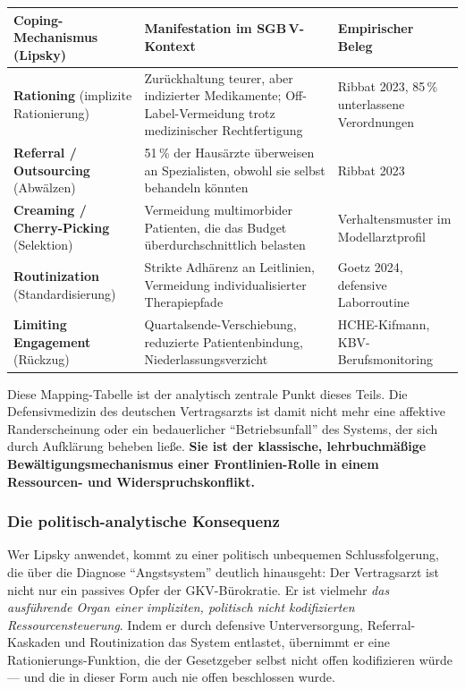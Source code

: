\documentclass{umbruch-position}
\begin{document}
{\small
\begin{tabularx}{\textwidth}{X X X}
\toprule
\textbf{Coping-Mechanismus (Lipsky)} & \textbf{Manifestation im SGB\,V-Kontext} & \textbf{Empirischer Beleg} \\
\midrule
\textbf{Rationing} (implizite Rationierung) & Zurückhaltung teurer, aber indizierter Medikamente; Off-Label-Vermeidung trotz medizinischer Rechtfertigung & Ribbat 2023, 85\,\% unterlassene Verordnungen \\
\textbf{Referral / Outsourcing} (Abwälzen) & 51\,\% der Hausärzte überweisen an Spezialisten, obwohl sie selbst behandeln könnten & Ribbat 2023 \\
\textbf{Creaming / Cherry-Picking} (Selektion) & Vermeidung multimorbider Patienten, die das Budget überdurchschnittlich belasten & Verhaltensmuster im Modellarztprofil \\
\textbf{Routinization} (Standardisierung) & Strikte Adhärenz an Leitlinien, Vermeidung individualisierter Therapiepfade & Goetz 2024, defensive Laborroutine \\
\textbf{Limiting Engagement} (Rückzug) & Quartalsende-Verschiebung, reduzierte Patientenbindung, Niederlassungsverzicht & HCHE-Kifmann, KBV-Berufsmonitoring \\
\bottomrule
\end{tabularx}
}

Diese Mapping-Tabelle ist der analytisch zentrale Punkt dieses Teils. Die Defensivmedizin des deutschen Vertragsarzts ist damit nicht mehr eine affektive Randerscheinung oder ein bedauerlicher ``Betriebsunfall'' des Systems, der sich durch Aufklärung beheben ließe. \textbf{Sie ist der klassische, lehrbuchmäßige Bewältigungsmechanismus einer Frontlinien-Rolle in einem Ressourcen- und Widerspruchskonflikt.}

\subsubsection{Die politisch-analytische Konsequenz}

Wer Lipsky anwendet, kommt zu einer politisch unbequemen Schlussfolgerung, die über die Diagnose ``Angstsystem'' deutlich hinausgeht: Der Vertragsarzt ist nicht nur ein passives Opfer der GKV-Bürokratie. Er ist vielmehr \textit{das ausführende Organ einer impliziten, politisch nicht kodifizierten Ressourcensteuerung}. Indem er durch defensive Unterversorgung, Referral-Kaskaden und Routinization das System entlastet, übernimmt er eine Rationierungs-Funktion, die der Gesetzgeber selbst nicht offen kodifizieren würde --- und die in dieser Form auch nie offen beschlossen wurde.
\end{document}
